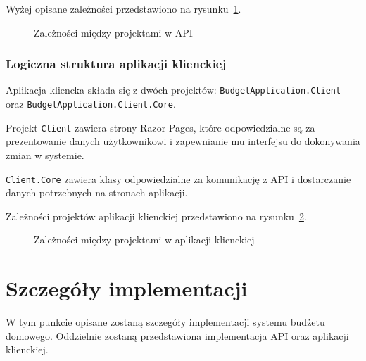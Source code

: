 Wyżej opisane zależności przedstawiono na rysunku~\ref{fig:api-arch}. 

\begin{figure}[t]
	\centering
	\caption{Zależności między projektami w API}
	\label{fig:api-arch}
\end{figure}

\subsubsection{Logiczna struktura aplikacji klienckiej}

Aplikacja kliencka składa się z dwóch projektów: \texttt{BudgetApplication.Client} oraz \texttt{BudgetApplication.Client.Core}. 

Projekt \texttt{Client} zawiera strony Razor Pages, które odpowiedzialne są za prezentowanie danych użytkownikowi i zapewnianie mu interfejsu do dokonywania zmian w systemie.

\texttt{Client.Core} zawiera klasy odpowiedzialne za komunikację z API i dostarczanie danych potrzebnych na stronach aplikacji.

Zależności projektów aplikacji klienckiej przedstawiono na rysunku~\ref{fig:client-arch}.

\begin{figure}[t]
	\centering
	\caption{Zależności między projektami w aplikacji klienckiej}
	\label{fig:client-arch}
\end{figure}

\section{Szczegóły implementacji}
\label{sec:szczegoly-implementacji}

W tym punkcie opisane zostaną szczegóły implementacji systemu budżetu domowego. Oddzielnie zostaną przedstawiona implementacja API oraz aplikacji klienckiej. 

